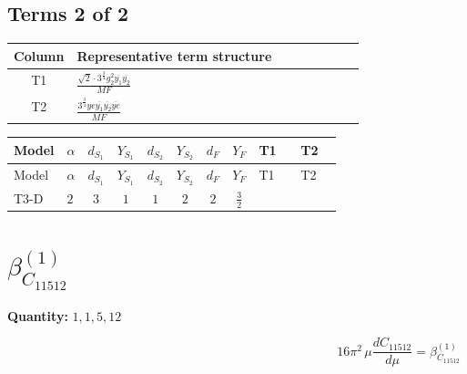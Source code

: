 \documentclass[8pt]{article}
\begin{document}
\begin{landscape}
\subsection*{Terms 2 of 2}
\begin{center}
\begin{tabular}{@{}c >{\raggedright\arraybackslash}p{0.82\linewidth}@{}}
\toprule
Column & Representative term structure \\
\midrule
T1 & \(\displaystyle \frac{\sqrt{2} \cdot 3^{\frac{3}{4}} g_{2}^{2} \overline{y_{1}} \overline{y_{2}}}{MF}\) \\
\midrule
T2 & \(\displaystyle \frac{3^{\frac{3}{4}} ye \overline{y_{1}} \overline{y_{2}} \overline{ye}}{MF}\) \\
\midrule
\bottomrule
\end{tabular}
\end{center}
\smallskip
\tiny
\begin{longtable}{@{}llcccccc >{\raggedright\arraybackslash}p{0.21\linewidth} >{\raggedright\arraybackslash}p{0.21\linewidth}@{}}
\toprule
Model & $\alpha$ & $d_{S_1}$ & $Y_{S_1}$ & $d_{S_2}$ & $Y_{S_2}$ & $d_F$ & $Y_F$ & T1 & T2 \\
\midrule
\endfirsthead
\toprule
Model & $\alpha$ & $d_{S_1}$ & $Y_{S_1}$ & $d_{S_2}$ & $Y_{S_2}$ & $d_F$ & $Y_F$ & T1 & T2 \\
\midrule
\endhead
T3-D & $2$ & $3$ & $1$ & $1$ & $2$ & $2$ & $\frac{3}{2}$ & \scriptsize\adjustbox{max width=\linewidth}{$\begin{gathered} - \frac{\sqrt{2} \cdot 3^{\frac{3}{4}} g_{2}^{2} \overline{y_{1}} \overline{y_{2}}}{3 MF}\end{gathered}$} & \scriptsize\adjustbox{max width=\linewidth}{$\begin{gathered} \frac{3^{\frac{3}{4}} ye \overline{y_{1}} \overline{y_{2}} \overline{ye}}{12 MF}\end{gathered}$} \\
\midrule
\bottomrule
\end{longtable}
\clearpage
\section*{$\beta_{C_{11512}}^{(1)}$}
\noindent\textbf{Quantity: }$\mathrm{1,1,5,12}$\par\smallskip
\[16\pi^2\,\mu\frac{d C_{11512}}{d\mu}=\beta_{C_{11512}}^{(1)}\]

\end{landscape}
\end{document}
